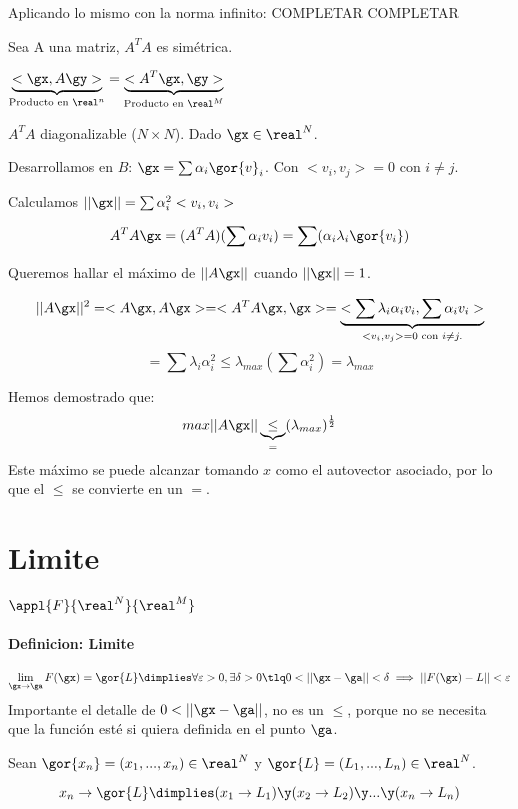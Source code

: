 \documentclass[a4paper,10pt]{apuntes}
\newcommand{\definition}[1]{\paragraph{Definicion: #1\\}}
\begin{document}
Aplicando lo mismo con la norma infinito: COMPLETAR
COMPLETAR

\begin{lemma}
 Sea A una matriz, $A^TA$ es simétrica.
\end{lemma}
\begin{lemma}
 $\underbrace{<\gx,A\gy>}_{\text{Producto en } \real^n} = \underbrace{<A^T\gx,\gy>}_{\text{Producto en } \real^M}$
\end{lemma}

 $A^TA$ diagonalizable ($N \times N$). Dado $\gx \in \real^N$.

 Desarrollamos en $B$: $\gx = \sum \alpha_i \gor{v}_i$. Con $<v_i,v_j> = 0$ con $i \neq j$.

 Calculamos $||\gx|| = \sum \alpha_i^2<v_i,v_i>$
 
 $$A^TA\gx = (A^TA)(\sum \alpha_i v_i) = \sum (\alpha_i\lambda_i\gor{v_i})$$
 
 Queremos hallar el máximo de $||A\gx||$ cuando $||\gx|| = 1$.
 
 $$||A\gx||^2 = <A\gx,A\gx> = <A^TA\gx,\gx> = \underbrace{<\sum \lambda_i \alpha_i v_i,\sum\alpha_i v_i>}_{<v_i,v_j> =0 \text{ con } i \neq j.}$$
 $$= \sum \lambda_i \alpha_i^2 \leq \lambda_{max} (\sum \alpha_i^2) = \lambda_{max}$$
 
 Hemos demostrado que:
 $$ max||A\gx|| \underbrace{\leq}_{=} ({\lambda_{max}})^{\frac{1}{2}}$$
 Este máximo se puede alcanzar tomando $x$ como el autovector asociado, por lo que el $\leq$ se convierte en un $=$.
 
 \section{Limite}
 $\appl{F}{\real^N}{\real^M}$
 
 \definition{Limite}
 $$\lim_{\gx \rightarrow \ga} F(\gx) = \gor{L} \dimplies \forall \varepsilon > 0,  \exists \delta>0 \tlq 0<||\gx-\ga|| <\delta \implies ||F(\gx) - L||<\varepsilon$$
 Importante el detalle de $0 < ||\gx-\ga||$, no es un $\leq$, porque no se necesita que la función esté si quiera definida en el punto $\ga$.
 \begin{theorem}
  
  Sean $\gor{x_n} = (x_1,...,x_n) \in \real^N$ y $\gor{L} = (L_1,...,L_n) \in \real^N$.
 
  $$x_n \rightarrow \gor{L} \dimplies (x_1 \rightarrow L_1) \y (x_2 \rightarrow L_2) \y ... \y (x_n \rightarrow L_n)$$
 \end{theorem}
 
\end{document}
